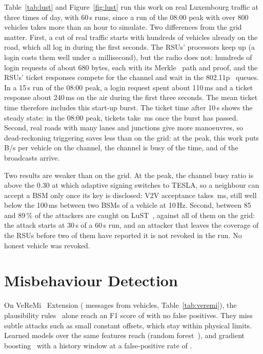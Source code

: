 Table~\ref{tab:lust} and Figure~\ref{fig:lust} run this work on real Luxembourg traffic at three
times of day, with 60\,s runs, since a run of the 08:00 peak with over 800 vehicles takes more than an
hour to simulate. Two differences from the grid matter. First, a cut of real traffic starts with
hundreds of vehicles already on the road, which all log in during the first seconds. The RSUs'
processors keep up (a login costs them well under a millisecond), but the radio does not: hundreds of
login requests of about 680 bytes, each with its Merkle~\cite{merkle1987} path and proof, and the RSUs' ticket responses
compete for the channel and wait in the 802.11p~\cite{jiang2008wave} queues. In a 15\,s run of the 08:00 peak, a login
request spent about 110\,ms and a ticket response about 240\,ms on the air during the first three
seconds. The mean ticket time therefore includes this start-up burst. The ticket time after 10\,s
shows the steady state: in the 08:00 peak, tickets take \,ms
once the burst has passed. Second, real roads with many lanes and junctions give more manoeuvres, so
dead-reckoning triggering saves less than on the grid: at the peak, this work puts
\,B/s per vehicle on the channel, the channel is
busy  of the time, and  of the
broadcasts arrive.

Two results are weaker than on the grid. At the peak, the channel busy ratio is above the 0.30 at
which adaptive signing switches to TESLA, so a neighbour can accept a BSM only once its key is
disclosed: V2V acceptance takes \,ms, still well below the
100\,ms between two BSMs of a vehicle at 10\,Hz. Second, between 85 and 89\,\%
of the attackers are caught on LuST~\cite{codeca2015lust}, against all of them on the grid: the attack starts at 30\,s of a
60\,s run, and an attacker that leaves the coverage of the RSUs before two of them have reported it is
not revoked in the run. No honest vehicle was revoked.

\section{Misbehaviour Detection}\label{sec:res-detect}


On VeReMi~\cite{kamel2020veremiext} Extension ( messages from  vehicles,
Table~\ref{tab:veremi}), the plausibility rules~\cite{heijden2018veremi} alone reach an F1 score of  with
no false positives. They miss subtle attacks such as small constant offsets, which stay within
physical limits. Learned models over the same features reach  (random forest~\cite{breiman2001rf}), and
gradient boosting~\cite{friedman2001gbm} with a history window  at a false-positive rate of
.

